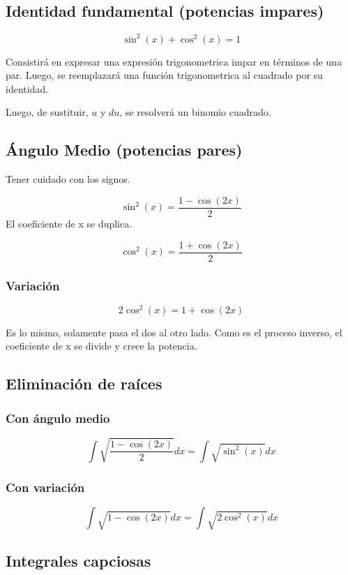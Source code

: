 \documentclass[11pt]{article}
\begin{document}
\subsection{Identidad fundamental (potencias impares)}
\label{sec-2-2}
\[\sin^2(x) + \cos^2(x) = 1\]

Consistirá en expresar una expresión trigonometrica impar en términos de una par.
Luego, se reemplazará una función trigonometrica al cuadrado por su identidad.

Luego, de sustituir, \(u\) y \(du\), se resolverá un binomio cuadrado.







\subsection{Ángulo Medio (potencias pares)}
\label{sec-2-3}

Tener cuidado con los signos.

\[\sin^2(x) = \frac{1 - \cos(2x)}{2}  \]
El coeficiente de x se duplica.

\[\cos^2(x) = \frac{1 + \cos(2x)}{2}  \]

\subsubsection{Variación}
\label{sec-2-3-1}

\[2\cos^2(x) = 1 + \cos(2x) \]

Es lo mismo, solamente pasa el dos al otro lado.
Como es el proceso inverso, el coeficiente de x se divide
y crece la potencia.

\subsection{Eliminación de raíces}
\label{sec-2-4}
\subsubsection{Con ángulo medio}
\label{sec-2-4-1}

\[\int \sqrt{\frac{1 - \cos(2x)}{2}} dx = \int \sqrt{\sin^2(x)}dx \]

\subsubsection{Con variación}
\label{sec-2-4-2}
\[\int \sqrt{1 - \cos(2x)} dx = \int \sqrt{2\cos^2(x)}dx \]
\subsection{Integrales capciosas}
\label{sec-2-5}
\end{document}
